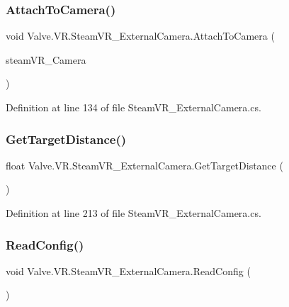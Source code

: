\subsubsection{\texorpdfstring{AttachToCamera()}{AttachToCamera()}}
{\footnotesize\ttfamily void Valve.\+V\+R.\+Steam\+V\+R\+\_\+\+External\+Camera.\+Attach\+To\+Camera (\begin{DoxyParamCaption}\item[{\mbox{\hyperlink{class_valve_1_1_v_r_1_1_steam_v_r___camera}{Steam\+V\+R\+\_\+\+Camera}}}]{steam\+V\+R\+\_\+\+Camera }\end{DoxyParamCaption})}



Definition at line 134 of file Steam\+V\+R\+\_\+\+External\+Camera.\+cs.

\mbox{\label{class_valve_1_1_v_r_1_1_steam_v_r___external_camera_a46f18bd38fbfbed8ea67bfe706f5e82a}} 
\subsubsection{\texorpdfstring{GetTargetDistance()}{GetTargetDistance()}}
{\footnotesize\ttfamily float Valve.\+V\+R.\+Steam\+V\+R\+\_\+\+External\+Camera.\+Get\+Target\+Distance (\begin{DoxyParamCaption}{ }\end{DoxyParamCaption})}



Definition at line 213 of file Steam\+V\+R\+\_\+\+External\+Camera.\+cs.

\mbox{\label{class_valve_1_1_v_r_1_1_steam_v_r___external_camera_ad7cf6593d79e674294e5a8c47a7589e5}} 
\subsubsection{\texorpdfstring{ReadConfig()}{ReadConfig()}}
{\footnotesize\ttfamily void Valve.\+V\+R.\+Steam\+V\+R\+\_\+\+External\+Camera.\+Read\+Config (\begin{DoxyParamCaption}{ }\end{DoxyParamCaption})}



